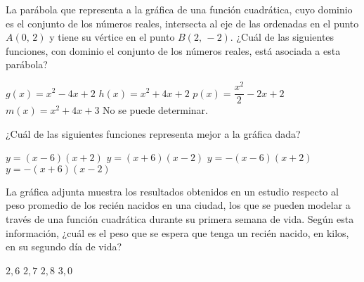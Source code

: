 \documentclass[
  titulo=Tarea,
  subtitulo=Álgebra y funciones,
  curso=Tercero medio,
  con nombre,
]{srs3}
\begin{document}
\begin{preguntas}
\pregunta La parábola que representa a la gráfica de una función cuadrática, cuyo dominio es el conjunto de los números reales, intersecta al eje de las ordenadas en el punto \(A\left(0,\,2\right)\) y tiene su vértice en el punto \(B\left(2,\,-2\right)\). ¿Cuál de las siguientes funciones, con dominio el conjunto de los números reales, está asociada a esta parábola?
\begin{alternativas}
\alternativa \( g\left(x\right)=x^2-4x+2 \)
\alternativa \( h\left(x\right)=x^2+4x+2 \)
\alternativa \( p\left(x\right)=\dfrac{x^2}{2}-2x+2 \)
\alternativa \( m\left(x\right)=x^2+4x+3 \)
\alternativa No se puede determinar.
\end{alternativas}

\pregunta ¿Cuál de las siguientes funciones representa mejor a la gráfica dada?
\begin{columnas}[0.5][t]
\begin{alternativas}
\alternativa \( y=\left(x-6\right)\left(x+2\right) \)
\alternativa \( y=\left(x+6\right)\left(x-2\right) \)
\alternativa \( y=-\left(x-6\right)\left(x+2\right) \)
\alternativa \( y=-\left(x+6\right)\left(x-2\right) \)
\end{alternativas}
\siguiente
{}
\end{columnas}

\pregunta La gráfica adjunta muestra los resultados obtenidos en un estudio respecto al peso promedio de los recién nacidos en una ciudad, los que se pueden modelar a través de una función cuadrática durante su primera semana de vida. Según esta información, ¿cuál es el peso que se espera que tenga un recién nacido, en kilos, en su segundo día de vida?
\begin{columnas}[0.5][t]
\begin{alternativas}
\alternativa \(2,6\)
\alternativa \(2,7\)
\alternativa \(2,8\)
\alternativa \(3,0\)
\end{alternativas}
\siguiente
{}
\end{columnas}


\end{preguntas}
\end{document}
